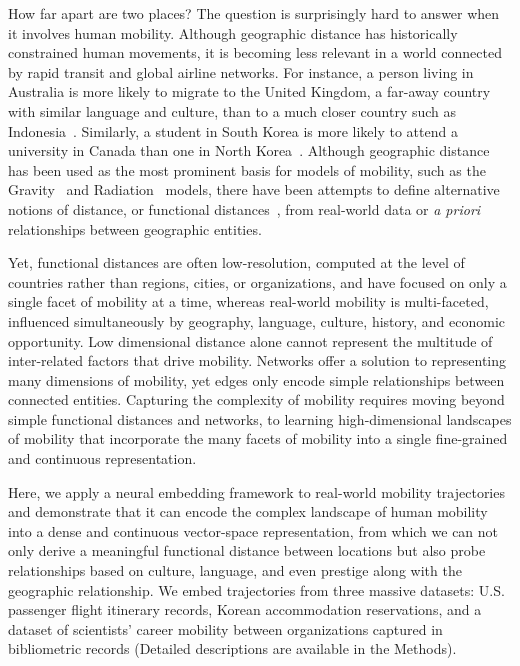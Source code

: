 \documentclass[12pt]{article} %
\begin{document}
How far apart are two places?
The question is surprisingly hard to answer when it involves human mobility.
Although geographic distance has historically constrained human movements, it is becoming less relevant in a world connected by rapid transit and global airline networks.
For instance, a person living in Australia is more likely to migrate to the United Kingdom, a far-away country with similar language and culture, than to a much closer country such as Indonesia~\autocite{pew2018migration}.
Similarly, a student in South Korea is more likely to attend a university in Canada than one in North Korea~\autocite{unesco2019students}.
Although geographic distance has been used as the most prominent basis for models of mobility, such as the Gravity~\autocite{zipf1946gravity} and Radiation~\autocite{simini2012universal} models, there have been attempts to define alternative notions of distance, or functional distances~\autocite{boschma2005proximity, brown1970migration, kim2018functional}, from real-world data or \textit{a priori} relationships between geographic entities.

Yet, functional distances are often low-resolution, computed at the level of countries rather than regions, cities, or organizations, and have focused on only a single facet of mobility at a time, whereas real-world mobility is multi-faceted, influenced simultaneously by geography, language, culture, history, and economic opportunity.
Low dimensional distance alone cannot represent the multitude of inter-related factors that drive mobility.
Networks offer a solution to representing many dimensions of mobility, yet edges only encode simple relationships between connected entities.
Capturing the complexity of mobility requires moving beyond simple functional distances and networks, to learning high-dimensional landscapes of mobility that incorporate the many facets of mobility into a single fine-grained and continuous representation.

Here, we apply a neural embedding framework to real-world mobility trajectories and demonstrate that it can encode the complex landscape of human mobility into a dense and continuous vector-space representation, from which we can not only derive a meaningful functional distance between locations but also probe relationships based on culture, language, and even prestige along with the geographic relationship.
We embed trajectories from three massive datasets: U.S. passenger flight itinerary records, Korean accommodation reservations, and a dataset of scientists' career mobility between organizations captured in bibliometric records (Detailed descriptions are available in the Methods).
\end{document}
